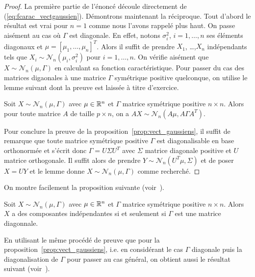  \begin{proof}\smartqed
   La premi\`ere partie de l'\'enonc\'e d\'ecoule directement de
   (\ref{eq:fcarac_vectgaussien}).  D\'emontrons maintenant la r\'eciproque. Tout
   d'abord le r\'esultat est vrai pour $n=1$ comme nous l'avons rappel\'e plus haut. On
   passe ais\'ement au cas o\`u $\Gamma$ est diagonale. En effet, notons
   $\sigma_i^2$, $i=1,\dots,n$ ses \'el\'ements diagonaux et
   $\mu=[\mu_1,\dots,\mu_n]^T$. Alors il suffit de prendre $X_1$, \dots ,$X_n$
   ind\'ependants tels que $X_i\sim\mathcal{N}_n( \mu_i, \sigma_i^2)$ pour
   $i=1,\dots,n$. On v\'erifie ais\'ement que $X\sim\mathcal{N}_n( \mu, \Gamma)$ en
   calculant sa fonction caract\'eristique. Pour passer du cas des matrices
   digaonales \`a une matrice $\Gamma$ sym\'etrique
   positive quelconque, on utilise le lemme suivant dont la preuve est laiss\'ee
   \`a titre d'exercice.
   \begin{lemma}
     Soit $X\sim\mathcal{N}_n( \mu, \Gamma)$ avec $\mu\in\mathbb{R}^n$ et
      $\Gamma$ matrice sym\'etrique positive $n\times n$. Alors pour toute
      matrice $A$ de taille $p\times n$, on a  $AX\sim\mathcal{N}_n( A\mu,
      A\Gamma A^T)$.
   \end{lemma}
   Pour conclure la preuve de la proposition~\ref{prop:vect_gaussiens}, il
   suffit de remarque que toute matrice sym\'etrique
   positive $\Gamma$ est diagonalisable en base orthonorm\'ee et s'\'ecrit donc
   $\Gamma=U\Sigma U^T$ avec $\Sigma$ matrice diagonale positive et $U$ matrice
   orthogonale. Il suffit alors de prendre $Y\sim\mathcal{N}_n( U^T\mu, \Sigma)$
   et de poser $X=UY$ et le lemme donne $X\sim\mathcal{N}_n( \mu, \Gamma)$
   comme recherch\'e.
\end{proof}

On montre facilement la proposition suivante
(voir~\cite[Corollaire~16.1]{jacod:protter:2003}).

\begin{proposition}\label{prop:vect_gaussiens_indep}
   Soit $X\sim\mathcal{N}_n( \mu, \Gamma)$ avec $\mu\in\mathbb{R}^n$ et $\Gamma$
   matrice sym\'etrique positive $n\times n$. Alors $X$ a des composantes
   ind\'ependantes si et seulement si $\Gamma$ est une matrice diagonnale.
 \end{proposition}


En utilisant le m\^{e}me proc\'ed\'e de preuve que pour la
proposition~\ref{prop:vect_gaussiens}, i.e. en consid\'erant le cas $\Gamma$
diagonale puis la diagonalisation de $\Gamma$ pour passer au cas g\'en\'eral, on
obtient aussi le r\'esultat suivant (voir~\cite[Corollaire~16.2]{jacod:protter:2003}).

